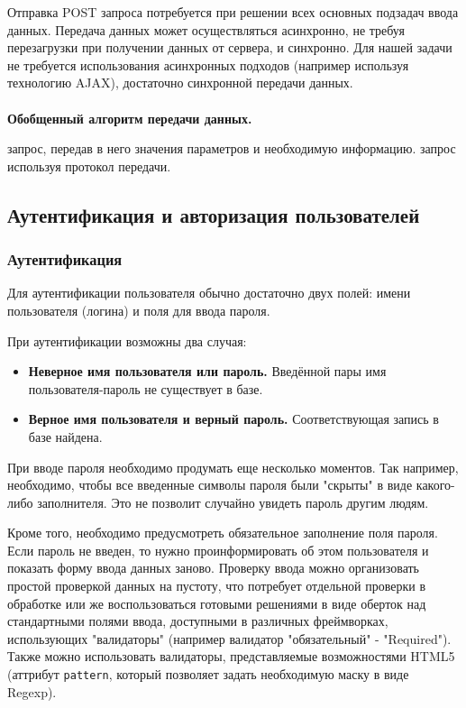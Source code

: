 \documentclass[a4paper]{article}
\begin{document}
Отправка POST запроса потребуется при решении всех основных подзадач ввода данных. Передача данных может осуществляться асинхронно, не требуя перезагрузки при получении данных от сервера, и синхронно. Для нашей задачи не требуется использования асинхронных подходов (например используя технологию AJAX), достаточно синхронной передачи данных.\\\\

\textbf{Обобщенный алгоритм передачи данных.}
\begin{enumerate}
 запрос, передав в него значения параметров и необходимую информацию.
 запрос используя протокол передачи.
\end{enumerate}

\subsection{Аутентификация и авторизация пользователей}

\subsubsection{Аутентификация}

Для аутентификации пользователя обычно достаточно двух полей: имени пользователя (логина) и поля для ввода пароля. 

При аутентификации возможны два случая:
\begin{itemize}
\item\textbf{Неверное имя пользователя или пароль.} Введённой пары имя пользователя-пароль не существует в базе.
\item\textbf{Верное имя пользователя и верный пароль.} Соответствующая запись в базе найдена.
\end{itemize}

При вводе пароля необходимо продумать еще несколько моментов. Так например, необходимо, чтобы все введенные символы пароля были "скрыты" в виде какого-либо заполнителя. Это не позволит случайно увидеть пароль другим людям. 

Кроме того, необходимо предусмотреть обязательное заполнение поля пароля. Если пароль не введен, то нужно проинформировать об этом пользователя и показать форму ввода данных заново. Проверку ввода можно организовать простой проверкой данных на пустоту, что потребует отдельной проверки в обработке или же воспользоваться готовыми решениями в виде оберток над стандартными полями ввода, доступными в различных фреймворках, использующих "валидаторы" (например валидатор "обязательный" - "Required"). Также можно использовать валидаторы, представляемые возможностями HTML5 (аттрибут \texttt{pattern}, который позволяет задать необходимую маску в виде Regexp).
\end{document}
